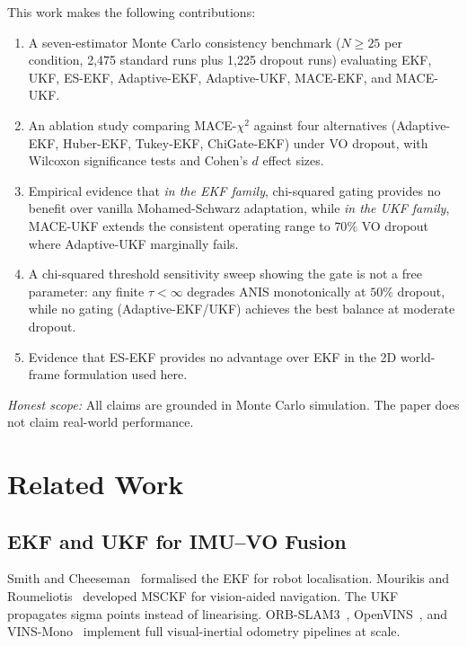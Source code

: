 \documentclass[letterpaper, 10pt, journal]{IEEEtran}
\begin{document}
This work makes the following contributions:
\begin{enumerate}
\item A seven-estimator Monte Carlo consistency benchmark ($N\!\geq\!25$
  per condition, 2,475 standard runs plus 1,225 dropout runs) evaluating
  EKF, UKF, ES-EKF, Adaptive-EKF, Adaptive-UKF, MACE-EKF, and MACE-UKF.
\item An ablation study comparing MACE-$\chi^2$ against four alternatives
  (Adaptive-EKF, Huber-EKF, Tukey-EKF, ChiGate-EKF) under VO dropout,
  with Wilcoxon significance tests and Cohen's $d$ effect sizes.
\item Empirical evidence that \emph{in the EKF family}, chi-squared gating
  provides no benefit over vanilla Mohamed-Schwarz adaptation, while
  \emph{in the UKF family}, MACE-UKF extends the consistent operating
  range to $70\%$ VO dropout where Adaptive-UKF marginally fails.
\item A chi-squared threshold sensitivity sweep showing the gate is not
  a free parameter: any finite $\tau < \infty$ degrades ANIS monotonically
  at $50\%$ dropout, while no gating (Adaptive-EKF/UKF) achieves the best
  balance at moderate dropout.
\item Evidence that ES-EKF provides no advantage over EKF in the 2D
  world-frame formulation used here.
\end{enumerate}

\emph{Honest scope:} All claims are grounded in Monte Carlo simulation.
The paper does not claim real-world performance.

\section{Related Work}
\label{sec:related}

\subsection{EKF and UKF for IMU--VO Fusion}
Smith and Cheeseman~\cite{smith1986representation} formalised the EKF for
robot localisation. Mourikis and Roumeliotis~\cite{mourikis2007msckf}
developed MSCKF for vision-aided navigation. The UKF~\cite{wan2000ukf}
propagates sigma points instead of linearising. ORB-SLAM3~\cite{campos2021orbslam3},
OpenVINS~\cite{geneva2020openvins}, and VINS-Mono~\cite{qin2018vins} implement
full visual-inertial odometry pipelines at scale.
\end{document}
